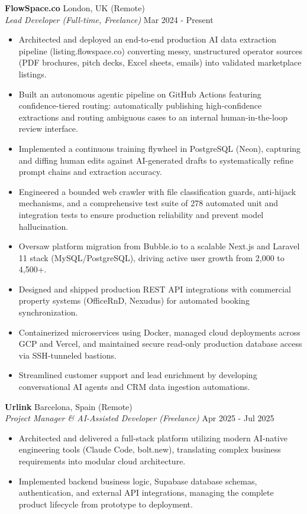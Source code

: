 \documentclass[10pt,a4paper]{article}
\begin{document}
\textbf{FlowSpace.co} \hfill London, UK (Remote)\\
\textit{Lead Developer (Full-time, Freelance)} \hfill Mar 2024 - Present
\begin{itemize}
    \item Architected and deployed an end-to-end production AI data extraction pipeline (listing.flowspace.co) converting messy, unstructured operator sources (PDF brochures, pitch decks, Excel sheets, emails) into validated marketplace listings.
    \item Built an autonomous agentic pipeline on GitHub Actions featuring confidence-tiered routing: automatically publishing high-confidence extractions and routing ambiguous cases to an internal human-in-the-loop review interface.
    \item Implemented a continuous training flywheel in PostgreSQL (Neon), capturing and diffing human edits against AI-generated drafts to systematically refine prompt chains and extraction accuracy.
    \item Engineered a bounded web crawler with file classification guards, anti-hijack mechanisms, and a comprehensive test suite of 278 automated unit and integration tests to ensure production reliability and prevent model hallucination.
    \item Oversaw platform migration from Bubble.io to a scalable Next.js and Laravel 11 stack (MySQL/PostgreSQL), driving active user growth from 2,000 to 4,500+.
    \item Designed and shipped production REST API integrations with commercial property systems (OfficeRnD, Nexudus) for automated booking synchronization.
    \item Containerized microservices using Docker, managed cloud deployments across GCP and Vercel, and maintained secure read-only production database access via SSH-tunneled bastions.
    \item Streamlined customer support and lead enrichment by developing conversational AI agents and CRM data ingestion automations.
\end{itemize}

\vspace{0.2em}
\textbf{Urlink} \hfill Barcelona, Spain (Remote)\\
\textit{Project Manager \& AI-Assisted Developer (Freelance)} \hfill Apr 2025 - Jul 2025
\begin{itemize}
    \item Architected and delivered a full-stack platform utilizing modern AI-native engineering tools (Claude Code, bolt.new), translating complex business requirements into modular cloud architecture.
    \item Implemented backend business logic, Supabase database schemas, authentication, and external API integrations, managing the complete product lifecycle from prototype to deployment.
\end{itemize}
\end{document}
